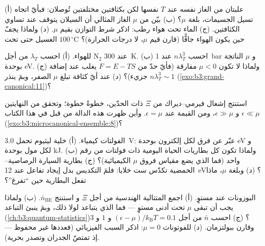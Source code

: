 \begin{exercise}[$\star$]\label{exo:b3:grand-canonical:1}
(أ) علبتان من الغاز نفسه عند $T$ نفسها لكن بكثافتين
مختلفتين تُوصلان: فبأيّ اتجاه تسيل الجسيمات، بلغة
$\mu$؟ (ب) بيّن من $\mu$ الغاز المثالي أن السيلان يتوقف
عند تساوي الكثافتين. (ج) الماء تحت هواء رطب: اذكر
شرط التوازن بقيم $\mu$. (د) ولماذا يجفّ الغسيل حتى
تحت $100\,^\circ$C حين يكون الهواء جافًّا (قارن قيم $\mu$، لا
درجات الحرارة)؟
\end{exercise}

\begin{exercise}[$\star$]\label{exo:b3:grand-canonical:2}
 للهواء. (أ) احسب $\lambda_T$ من أجل N$_2$
عند \qty{300}{K}. (ب) احسب $n\lambda_T^3$ عند \qty{1}{bar} و
$\mu$ الناتجة بوحدة eV. (ج) ولماذا لا تكون $\mu < 0$ مفارقة
(فأيّ حدّ من $F = E - TS$ يغلب عند إضافة جزيء)؟ (د)
عند أيّ كثافة تبلغ $\mu$ الصفر، وبمَ ينذر
$n\lambda_T^3 \sim 1$
(\cref{exo:b3:grand-canonical:11})؟
\end{exercise}

\begin{exercise}[$\star$]\label{exo:b3:grand-canonical:3}
استنتج إشغال فيرمي--ديراك من $\Xi$ ذات الحدّين،
خطوةً خطوة؛ وتحقق من النهايتين $\epsilon \ll \mu$ و $\epsilon \gg
\mu$، ومن القيمة عند $\epsilon = \mu$. وأين ظهرت هذه الدالة
من قبل في هذا الكتاب
(\cref{exo:b3:microcanonical-ensemble:8})؟
\end{exercise}

\begin{exercise}[$\star$]\label{exo:b3:grand-canonical:4}
الفولتات كيمياء. (أ) خلية ليثيوم تحمل \qty{3.0}{V}:
عبّر عن فرق  لكل إلكترون بوحدة eV و
لكل مول بوحدة kJ. (ب) ولماذا تكون كل بطاريات الحياة اليومية ذات
فولتات من رقم واحد (فما الذي يضع مقياس فروق $\mu$ الكيميائية)؟ (ج)
بطارية السيارة الرصاصية--الحمضية تكدّس ست خلايا: فلمَ التكديس بدل
إيجاد تفاعل عند \qty{12}{eV}؟ (د) وبلغة $\mu$، ماذا تفعل
البطارية حين ``تفرغ''؟
\end{exercise}

\begin{exercise}[$\star\star$]\label{exo:b3:grand-canonical:5}
البوزونات عند مستوٍ. (أ) اجمع المتتالية الهندسية من أجل $\Xi$ و
استنتج $\bar n_{\text{BE}}$. (ب) ولماذا يجب أن تبقى $\mu$ تحت
أدنى مستوٍ --- فما الذي يتباعد لولا ذلك، وبمَ ينبئ
التباعد (\cref{ch:b3:quantum-statistics})؟ (ج)
احسب $\bar n$ من أجل $(\epsilon - \mu)/k_{\text{B}}T = 0.1$ و $1$
و $3$ وقارن ببولتزمان. (د) للفوتونات $\mu = 0$: اذكر
السبب الفيزيائي (فعددها غير محفوظ --- إذ تمتصّ الجدران
وتصدر بحرية).
\end{exercise}

